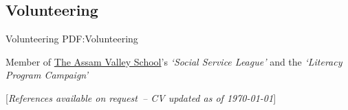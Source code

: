 \documentclass[a4paper,10pt,oneside]{article}
\newcommand{\CVReferences}{References available on request}
\newcommand{\CVNote}{\CVReferences\ -- CV updated as of {\today}}
\begin{document}
\begin{body}
\section
{Volunteering}
{Volunteering}
{PDF:Volunteering}

Member of \href{http://www.assamvalleyschool.com}{The Assam Valley School}'s \textit{`Social Service League'} and the \textit{`Literacy Program Campaign'}



%



\begin{flushright}
\footnotesize%
[\textit{\CVNote}]%
\end{flushright}


\end{body}
\label{LastPage} %
\end{document}
